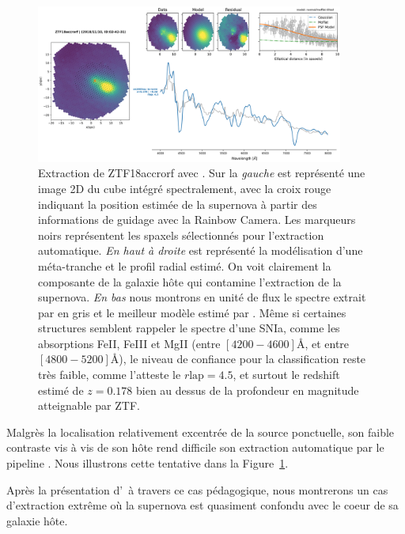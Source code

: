 \documentclass[../main/main.tex]{subfiles}
\begin{document}
\begin{figure}[h]
  \centering
  \includegraphics[width=0.9\textwidth]{../figures/04_hypergal/easycaseextractionpysedm.png}
  \caption[Extraction de ZTF18accrorf avec \pysedm]{Extraction de
    ZTF18accrorf avec \pysedm. Sur la \textit{gauche} est représenté une image 2D
  du cube intégré spectralement, avec la croix rouge indiquant la
  position estimée de la supernova à partir des informations de
    guidage avec la Rainbow Camera. Les marqueurs noirs représentent les
  spaxels sélectionnés pour l'extraction automatique. \textit{En haut à
    droite} est représenté la modélisation d'une méta-tranche et le
  profil radial estimé. On voit clairement la composante de la galaxie
  hôte qui contamine l'extraction de la supernova. \textit{En bas} nous
  montrons en unité de flux le spectre extrait par \pysedm en gris et le
meilleur modèle estimé par . Même si certaines structures
semblent rappeler le spectre d'une SNIa, comme les absorptions FeII,
FeIII et MgII (entre $[4200-4600]$\AA, et entre $[4800-5200]$\AA), le
niveau de confiance pour la classification reste très faible, comme
l'atteste le $r\text{lap}=4.5$, et surtout le redshift estimé de
$z=0.178$ bien au dessus de la profondeur en magnitude atteignable par ZTF.  }
  \label{fig:easycaseextractionpysedm}
\end{figure}


Malgrès la localisation relativement excentrée de la source ponctuelle,
son faible contraste vis à vis de son hôte rend difficile son extraction
automatique par le pipeline \pysedm. Nous illustrons cette tentative
dans la Figure~\ref{fig:easycaseextractionpysedm}.

Après la présentation d'\hypergal\ à travers ce cas pédagogique, nous
montrerons un cas d'extraction extrême où la supernova est quasiment
confondu avec le coeur de sa galaxie hôte.


%
%
\end{document}
